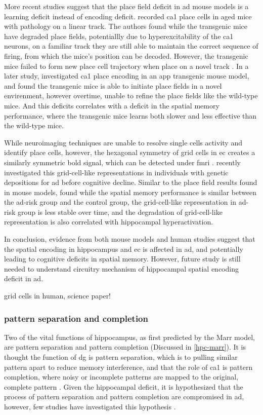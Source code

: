 More recent studies suggest that the place field deficit in \gls{ad} mouse models is a learning deficit instead of encoding deficit. \citet{cheng13} recorded \gls{ca1} place cells in aged mice with \atau{} pathology on a linear track. The authors found while the transgenic mice have degraded place fields, potentiallly due to hyperexcitability of the \gls{ca1} neurons, on a familiar track they are still able to maintain the correct sequence of firing, from which the mice's position can be decoded. However, the transgenic mice failed to form new place cell trajectory when place on a novel track \citep{cheng13}. In a later study, \citet{zhao14} investigated \gls{ca1} place encoding in an \gls{app} transgenic mouse model, and found the transgenic mice is able to initiate place fields in a novel envirenment, however overtime, unable to refine the place fields like the wild-type mice. And this deficits correlates with a deficit in the spatial memory performance, where the transgenic mice learns both slower and less effective than the wild-type mice.

While neuroimaging techniques are unable to resolve single cells activity and identify place cells, however, the hexagonal symmetry of grid cells in \gls{ec} creates a similarly symmetric \gls{bold} signal, which can be detected under \gls{fmri} \citep{doeller10}. \citet{kunz15} recently investigated this grid-cell-like representations in individuals with genetic depositions for \gls{ad} before cognitive decline. Similar to the place field results found in mouse models, \citet{kunz15} found while the spatial memory performance is similar between the \gls{ad}-risk group and the control group, the grid-cell-like representation in \gls{ad}-risk group is less stable over time, and the degradation of grid-cell-like representation is also correlated with hippocampal hyperactivation. 

In conclusion, evidence from both mouse models and human studies suggest that the spatial encoding in hippocampus and \gls{ec} is affected in \gls{ad}, and potentially leading to cognitive deficits in spatial memory. However, future study is still needed to understand circuitry mechanism of hippocampal spatial encoding deficit in \gls{ad}.


\citep{cacucci08}
\citep{cheng13}
\citep{zhao14}
\citep{kunz15} grid cells in human, science paper!
\subsubsection{pattern separation and completion}
Two of the vital functions of hippocampus, as first predicted by the Marr model, are pattern separation and pattern completion (Discussed in \ref{hpc-marr}). It is thought the function of \gls{dg} is pattern separation, which is to pulling similar pattern apart to reduce memory interference, and that the role of \gls{ca1} is pattern completion, where noisy or incomplete patterns are mapped to the original, complete pattern . Given the hippocampal deficit, it is hypothesized that the process of pattern separation and pattern completion are compromised in \gls{ad}, however, few studies have investigated this hypothesis \citep{maruszak14}. 

